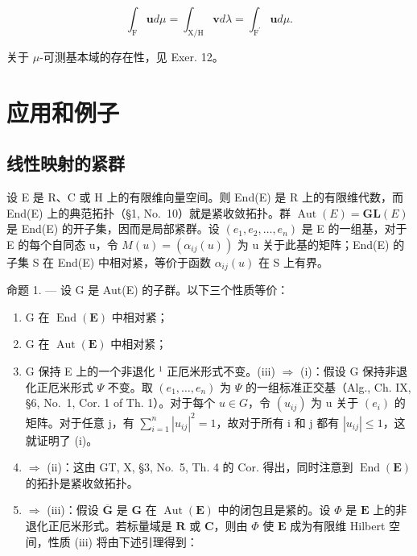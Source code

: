 \[
\int_ {\mathrm{F}} \mathbf {u} d \mu = \int_ {\mathrm{X/H}} \mathbf {v} d \lambda = \int_ {\mathrm{F} ^ {\prime}} \mathbf {u} d \mu .
\]

关于 \(\mu\)-可测基本域的存在性，见 Exer. 12。

\section{应用和例子}

\subsection{线性映射的紧群}

设 E 是 R、C 或 H 上的有限维向量空间。则 End(E) 是 R 上的有限维代数，而 End(E) 上的典范拓扑（§1, No.~10）就是紧收敛拓扑。群 \(\operatorname{Aut}(E) = \mathbf{GL}(E)\) 是 End(E) 的开子集，因而是局部紧群。设 \((e_{1}, e_{2}, \ldots, e_{n})\) 是 E 的一组基，对于 E 的每个自同态 u，令 \(M(u) = (\alpha_{ij}(u))\) 为 u 关于此基的矩阵；End(E) 的子集 S 在 End(E) 中相对紧，等价于函数 \(\alpha_{ij}(u)\) 在 S 上有界。

命题 1. --- 设 G 是 Aut(E) 的子群。以下三个性质等价：

\begin{enumerate}
\def\labelenumi{(\roman{enumi})}
\item
  G 在 \(\operatorname{End}(\mathbf{E})\) 中相对紧；
\item
  G 在 \(\operatorname{Aut}(\mathbf{E})\) 中相对紧；
\item
  G 保持 E 上的一个非退化 \(^{1}\) 正厄米形式不变。(iii) \(\Rightarrow\) (i)：假设 G 保持非退化正厄米形式 \(\Psi\) 不变。取 \((e_{1},\ldots,e_{n})\) 为 \(\Psi\) 的一组标准正交基（Alg., Ch. IX, §6, No.~1, Cor. 1 of Th. 1）。对于每个 \(u\in G\)，令 \((u_{ij})\) 为 u 关于 \((e_{i})\) 的矩阵。对于任意 j，有 \(\sum_{i=1}^{n}|u_{ij}|^{2}=1\)，故对于所有 i 和 j 都有 \(|u_{ij}|\leqslant1\)，这就证明了 (i)。
\item
  \(\Rightarrow\) (ii)：这由 GT, X, §3, No.~5, Th. 4 的 Cor. 得出，同时注意到 \(\operatorname{End}(\mathbf{E})\) 的拓扑是紧收敛拓扑。
\item
  \(\Rightarrow\) (iii)：假设 \(\overline{\mathbf{G}}\) 是 \(\mathbf{G}\) 在 \(\operatorname{Aut}(\mathbf{E})\) 中的闭包且是紧的。设 \(\Phi\) 是 \(\mathbf{E}\) 上的非退化正厄米形式。若标量域是 \(\mathbf{R}\) 或 \(\mathbf{C}\)，则由 \(\Phi\) 使 \(\mathbf{E}\) 成为有限维 Hilbert 空间，性质 (iii) 将由下述引理得到：
\end{enumerate}

